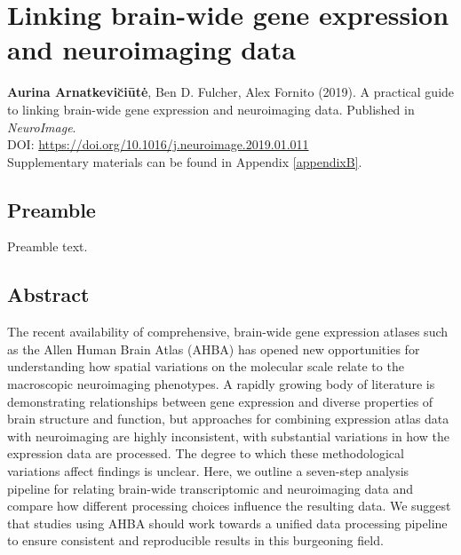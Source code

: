 \chapter{Linking brain-wide gene expression and neuroimaging data}
\label{ch:Chapter4}



\textbf{Aurina Arnatkevi\u{c}i\={u}t\.{e}},
Ben D. Fulcher,
Alex Fornito (2019).
A practical guide to linking brain-wide gene expression and neuroimaging data. Published in \textit{NeuroImage}.\\
DOI: \url{https://doi.org/10.1016/j.neuroimage.2019.01.011} %
\\
Supplementary materials can be found in Appendix \ref{appendixB}.


\section*{Preamble}
Preamble text.

\newpage

\section*{Abstract}
The recent availability of comprehensive, brain-wide gene expression atlases such as the Allen Human Brain Atlas (AHBA) has opened new opportunities for understanding how spatial variations on the molecular scale relate to the macroscopic neuroimaging phenotypes. A rapidly growing body of literature is demonstrating relationships between gene expression and diverse properties of brain structure and function, but approaches for combining expression atlas data with neuroimaging are highly inconsistent, with substantial variations in how the expression data are processed. The degree to which these methodological variations affect findings is unclear. Here, we outline a seven-step analysis pipeline for relating brain-wide transcriptomic and neuroimaging data and compare how different processing choices influence the resulting data. We suggest that studies using AHBA should work towards a unified data processing pipeline to ensure consistent and reproducible results in this burgeoning field.

